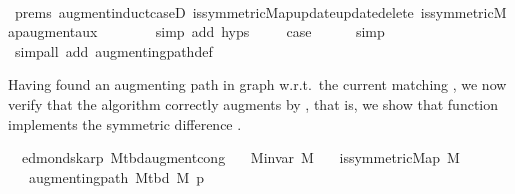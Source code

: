 \begin{isabellebody}
\ \ \ \ \ \ \isamarkupfalse%
\ {\isachardoublequoteopen}{}{\isachardot}{\kern0pt}prems{\isachardoublequoteclose}\ augment{\isacharunderscore}{\kern0pt}induct{\isacharunderscore}{\kern0pt}case{\isacharunderscore}{\kern0pt}{}D{\isacharparenleft}{\kern0pt}{}{}{\isacharparenright}{\kern0pt}\ is{\isacharunderscore}{\kern0pt}symmetric{\isacharunderscore}{\kern0pt}Map{\isacharunderscore}{\kern0pt}update{\isacharunderscore}{\kern0pt}update{\isacharunderscore}{\kern0pt}delete\ is{\isacharunderscore}{\kern0pt}symmetric{\isacharunderscore}{\kern0pt}Map{\isacharunderscore}{\kern0pt}augment{\isacharunderscore}{\kern0pt}aux\isanewline
\ \ \ \ \ \ \isamarkupfalse%
\ {\isacharparenleft}{\kern0pt}simp\ add{\isacharcolon}{\kern0pt}\ {\isachardoublequoteopen}{}{\isachardot}{\kern0pt}hyps{\isachardoublequoteclose}{\isacharparenright}{\kern0pt}\ \isacommand{{\isacharbraceright}{\kern0pt}}\isamarkupfalse%
\isanewline
\ \ \isamarkupfalse%
\ {\isacharquery}{\kern0pt}case\isanewline
\ \ \ \ \isamarkupfalse%
\ simp\isanewline
{}\isamarkupfalse%
\ {\isacharparenleft}{\kern0pt}simp{\isacharunderscore}{\kern0pt}all\ add{\isacharcolon}{\kern0pt}\ augmenting{\isacharunderscore}{\kern0pt}path{\isacharunderscore}{\kern0pt}def{\isacharparenright}{\kern0pt}%
\endisatagproof
{\isafoldproof}%
%
\isadelimproof
%
\endisadelimproof
%
\begin{isamarkuptext}%
Having found an augmenting path  in graph  w.r.t.\ the current matching ,
we now verify that the algorithm correctly augments  by , that is, we show that
function  implements the symmetric difference .%
\end{isamarkuptext}\isamarkuptrue%
\isamarkupfalse%
\ {\isacharparenleft}{\kern0pt}\ edmonds{\isacharunderscore}{\kern0pt}karp{\isacharparenright}{\kern0pt}\ M{\isacharunderscore}{\kern0pt}tbd{\isacharunderscore}{\kern0pt}augment{\isacharunderscore}{\kern0pt}cong{\isacharcolon}{\kern0pt}\isanewline
\ \ \ {\isachardoublequoteopen}M{\isachardot}{\kern0pt}invar\ M{\isachardoublequoteclose}\isanewline
\ \ \ {\isachardoublequoteopen}is{\isacharunderscore}{\kern0pt}symmetric{\isacharunderscore}{\kern0pt}Map\ M{\isachardoublequoteclose}\isanewline
\ \ \ {\isachardoublequoteopen}augmenting{\isacharunderscore}{\kern0pt}path\ {\isacharparenleft}{\kern0pt}M{\isacharunderscore}{\kern0pt}tbd\ M{\isacharparenright}{\kern0pt}\ p{\isachardoublequoteclose}\isanewline

\end{isabellebody}
